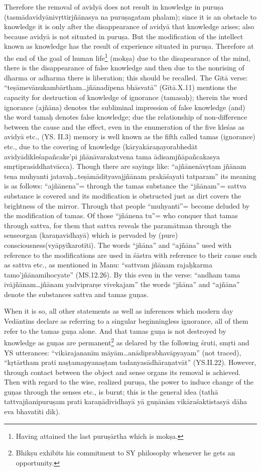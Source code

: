 Therefore the removal of avidyā does not result in knowledge in puruṣa  (tasmādavidyānivṛttirjñānasya na puruṣagatam phalam); since it is an obstacle to knowledge it is only after the disappearance of avidyā that knowledge arises; also because avidyā is not situated in puruṣa.  But the modification of the intellect known as knowledge has the result of experience situated in puruṣa. Therefore at the end of the goal of human life\footnote{Having attained the last puruṣārtha which is mokṣa.} (mokṣa) due to the disapearance of the mind, there is the disappearance of false knowledge and then due to the nonrising of dharma or adharma there is liberation; this should be recalled. The Gītā verse: “teṣāmevānukambārtham…jñānadīpena bhāsvatā” (Gītā.\-X.11) mentions the capacity for destruction of knowledge of ignorance (tamasaḥ); therein the word ignorance (ajñāna) denotes the subliminal impression of false knowledge (and) the word tamaḥ denotes false knowledge; due the relationship of non-difference between the cause and the effect, even in the enumeration of the five kleśas as avidyā etc., (YS. II.3) memory is well known as the fifth called tamas (ignorance) etc., due to the covering of knowledge   (kāryakāraṇayorabhedāt avidyādikleśapañcake’pi jñānāvarakatvena tama ādisamjñāpañcakasya smṛtiprasiddhatvācca). Though there are sayings like: “ajñānenāvṛtam jñānam tena muhyanti jatavaḥ…teṣāmādityavajjñānam prakāśayati tatparam” its meaning is as follows: “ajñānena”= through the tamas substance the “jñānam”= sattva substance is covered and its modification is obstructed just as dirt covers the brightness of the mirror.  Through that people “muhyanti”= become deluded by the modification of tamas. Of those “jñānena tu”= who conquer that tamas through sattva, for them that sattva reveals the paramātman through the sense\break organ (karaṇavidhayā) which is pervaded by (pure) consciousness\break (vyāpyīkarotīti). The words “jñāna” and “ajñāna” used with reference to the modifications are used in śāstra with reference to their cause such as sattva etc., as mentioned in Manu: “sattvam jñānam rajaḥ\break karma tamo’jñānamihocyate” (MS.12.26). By this even in the verse: “andham tama ivājñānam…jñānam yadviprarṣe vivekajam” the words “jñāna” and “ajñāna” denote the substances sattva and tamas guṇas.

When it is so, all other statements as well as inferences which modern day Vedāntins declare as referring to a singular beginningless ignorance, all of them refer to the tamas guṇa alone. And that tamas guṇa is not destroyed by knowledge as guṇas are permanent\footnote{Bhikṣu exhibits his commitment to SY philosophy whenever he gets an opportunity.} as delared by the following śruti, smṛti and YS utterances: “vikārajananīm māyām…anādiprabhavāpyayam” (not traced), “kṛtārtham prati naṣṭamapyanaṣṭam tadanyasādhāraṇatvāt” (YS.II.22). However, through contact between the object and sense organs its removal is achieved. Then with regard to the wise, realized puruṣa, the power to induce change of the guṇas through the senses etc., is burnt; this is the general idea (tathā tattvajñanipuruṣam prati karaṇādividhayā yā guṇānām vikāraśaktistasyā dāha eva bhavatīti dik).

